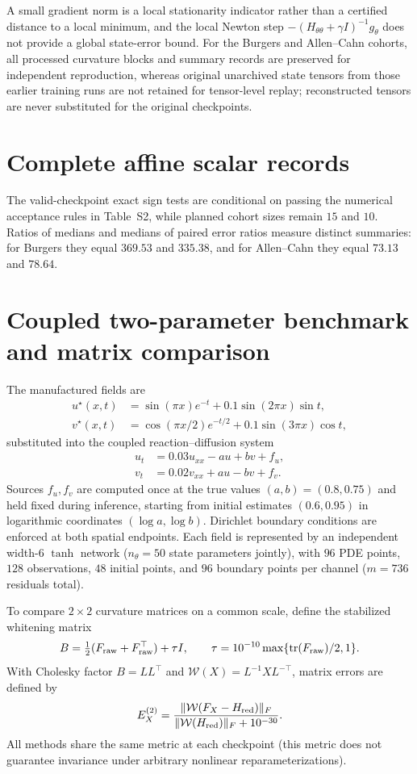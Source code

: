 \documentclass[10pt,letterpaper]{article}
\begin{document}
A small gradient norm is a local stationarity indicator rather than a certified distance to a local minimum, and the local Newton step $-(H_{\theta\theta}+\gamma I)^{-1}g_\theta$ does not provide a global state-error bound.
For the Burgers and Allen--Cahn cohorts, all processed curvature blocks and summary records are preserved for independent reproduction, whereas original unarchived state tensors from those earlier training runs are not retained for tensor-level replay; reconstructed tensors are never substituted for the original checkpoints.

\section{Complete affine scalar records}

The valid-checkpoint exact sign tests are conditional on passing the numerical acceptance rules in Table~S2, while planned cohort sizes remain $15$ and $10$.
Ratios of medians and medians of paired error ratios measure distinct summaries: for Burgers they equal $369.53$ and $335.38$, and for Allen--Cahn they equal $73.13$ and $78.64$.

\section{Coupled two-parameter benchmark and matrix comparison}
\label{sec:coupled}
The manufactured fields are
\begin{align}
 u^\star(x,t)&=\sin(\pi x)e^{-t}+0.1\sin(2\pi x)\sin t,\\
 v^\star(x,t)&=\cos(\pi x/2)e^{-t/2}+0.1\sin(3\pi x)\cos t,
\end{align}
substituted into the coupled reaction--diffusion system
\begin{align}
 u_t&=0.03u_{xx}-a u+b v+f_u,\\
 v_t&=0.02v_{xx}+a u-b v+f_v.
\end{align}
Sources $f_u,f_v$ are computed once at the true values $(a,b)=(0.8,0.75)$ and held fixed during inference, starting from initial estimates $(0.6,0.95)$ in logarithmic coordinates $(\log a,\log b)$.
Dirichlet boundary conditions are enforced at both spatial endpoints.
Each field is represented by an independent width-$6$ $\tanh$ network ($n_\theta=50$ state parameters jointly), with $96$ PDE points, $128$ observations, $48$ initial points, and $96$ boundary points per channel ($m=736$ residuals total).

To compare $2\times 2$ curvature matrices on a common scale, define the stabilized whitening matrix
\begin{equation}
 B=\tfrac12(F_{\rm raw}+F_{\rm raw}^{\top})+\tau I,
 \qquad \tau=10^{-10}\max\{\operatorname{tr}(F_{\rm raw})/2,1\}.
\end{equation}
With Cholesky factor $B=LL^\top$ and $\mathcal W(X)=L^{-1}XL^{-\top}$, matrix errors are defined by
\begin{equation}
 E_X^{(2)}=\frac{\|\mathcal W(F_X-H_{\rm red})\|_F}
 {\|\mathcal W(H_{\rm red})\|_F+10^{-30}}.
\end{equation}
All methods share the same metric at each checkpoint (this metric does not guarantee invariance under arbitrary nonlinear reparameterizations).
\end{document}
